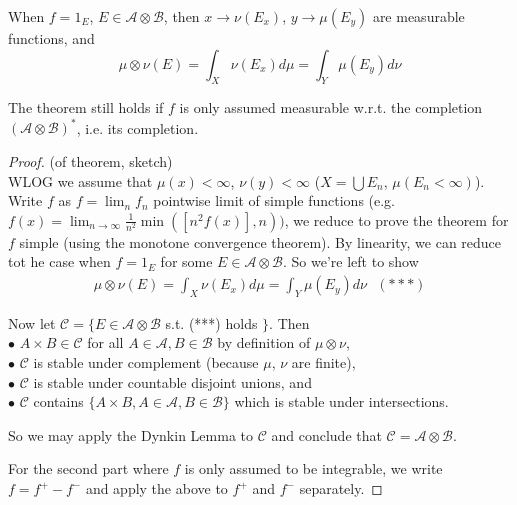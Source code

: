 \documentclass[a4paper]{article}
\begin{document}
\begin{rem}
When $f = 1_E$, $E \in \mathcal{A} \otimes \mathcal{B}$, then $x \to \nu(E_x)$, $y \to \mu(E_y)$ are measurable functions, and $$\mu \otimes \nu(E) = \int_X \nu(E_x) d\mu = \int_Y \mu (E_y) d\nu$$
\end{rem}

\begin{rem}
The theorem still holds if $f$ is only assumed measurable w.r.t. the completion $(\mathcal{A} \otimes \mathcal{B})^*$, i.e. its completion.
\end{rem}

\begin{proof} (of theorem, sketch)\\
WLOG we assume that $\mu(x) < \infty$, $\nu(y) < \infty$ ($X = \bigcup E_n$, $\mu(E_n < \infty)$). Write $f$ as $f = \lim_n f_n$ pointwise limit of simple functions (e.g. $f(x) = \lim_{n \to \infty} \frac{1}{n^2} \min([n^2 f(x)],n))$, we reduce to prove the theorem for $f$ simple (using the monotone convergence theorem). By linearity, we can reduce tot he case when $f = 1_E$ for some $E \in \mathcal{A} \otimes \mathcal{B}$. So we're left to show
\begin{equation*}
\begin{aligned}
\mu \otimes \nu(E) = \int_X \nu(E_x) d\mu = \int_Y \mu(E_y)d\nu \ \ \ (***)
\end{aligned}
\end{equation*}

Now let $\mathcal{C} = \{E \in \mathcal{A} \otimes \mathcal{B}$ s.t. (***) holds $\}$. Then\\
$\bullet$ $A \times B \in \mathcal{C}$ for all $A \in \mathcal{A},B \in \mathcal{B}$ by definition of $\mu \otimes \nu$,\\
$\bullet$ $\mathcal{C}$ is stable under complement (because $\mu$, $\nu$ are finite),\\
$\bullet$ $\mathcal{C}$ is stable under countable disjoint unions, and\\
$\bullet$ $\mathcal{C}$ contains $\{A \times B, A \in \mathcal{A},B \in \mathcal{B}\}$ which is stable under intersections.

So we may apply the Dynkin Lemma to $\mathcal{C}$ and conclude that $\mathcal{C} = \mathcal{A} \otimes \mathcal{B}$.

For the second part where $f$ is only assumed to be integrable, we write $f=f^+ - f^-$ and apply the above to $f^+$ and $f^-$ separately.
\end{proof}
\end{document}

